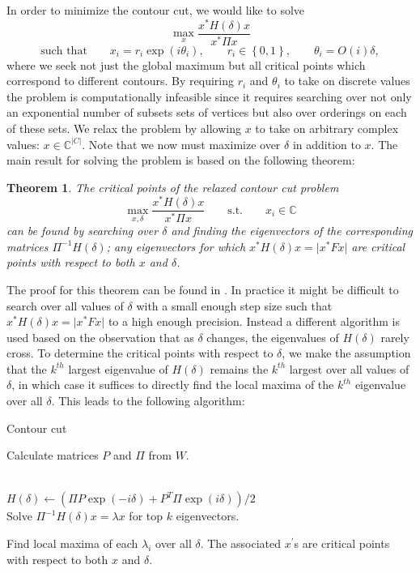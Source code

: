 \documentclass{SMBV12}
\newtheorem{theorem}{Theorem}[section]
\begin{document}
In order to minimize the contour cut, we would like to solve
\begin{equation}
\max_x \dfrac{x^*H(\delta)x}{x^* \Pi x} 
\end{equation}
\begin{equation*}
 \mbox{such that} \qquad x_i = r_i\exp(i\theta_i), \qquad r_i \in \left\lbrace 0, 1 \right\rbrace, \qquad \theta_i = O(i)\delta,
\end{equation*}
where we seek not just the global maximum but all critical points which correspond to different contours. By requiring $r_i$ and $\theta_i$ to take on discrete values the problem is computationally infeasible since it requires searching over not only an exponential number of subsets sets of vertices but also over orderings on each of these sets. We relax the problem by allowing $x$ to take on arbitrary complex values: $x \in \mathbb{C}^{\lvert C \rvert}$. Note that we now must maximize over $\delta$ in addition to $x$. The main result for solving the problem is based on the following theorem:
\begin{theorem}
The critical points of the relaxed contour cut problem
\begin{equation}
\max_{x, \delta} \dfrac{x^*H(\delta)x}{x^* \Pi x} \qquad \mbox{s.t.} \qquad x_i \in \mathbb{C}
\end{equation}
can be found by searching over $\delta$ and finding the eigenvectors of the corresponding matrices $\Pi^{-1}H(\delta)$; any eigenvectors for which $x^*H(\delta)x = \lvert x^*Fx \rvert$ are critical points
with respect to both $x$ and $\delta$.
\end{theorem}
The proof for this theorem can be found in \cite{KenGalShi2011}. In practice it might be difficult to search over all values of $\delta$ with a small enough step size such that $x^*H(\delta)x = \lvert x^*Fx \rvert$ to a high enough precision. Instead a different algorithm is used based on the observation that as $\delta$ changes, the eigenvalues of $H(\delta)$ rarely cross. To determine the critical points with respect to $\delta$, we make the assumption that the $k^{th}$ largest eigenvalue of $H(\delta)$ remains the $k^{th}$ largest over all values of $\delta$, in which case it suffices to directly find the local maxima of the $k^{th}$ eigenvalue over all $\delta$. This leads to the following algorithm:

\begin{algorithm}
\caption{Contour cut}
Calculate matrices $P$ and $\Pi$ from $W$.
\begin{algorithmic}
\\
\qquad $H(\delta) \leftarrow (\Pi P \exp(-i\delta) + P^T \Pi \exp(i\delta))/2$\\
\qquad Solve $\Pi^{-1} H(\delta)x = \lambda x$ for top $k$ eigenvectors.
\EndFor
\end{algorithmic}
Find local maxima of each $\lambda_i$ over all $\delta$. The associated $x^\prime$s are critical points with respect to both $x$ and $\delta$.
\end{algorithm}
\end{document}
